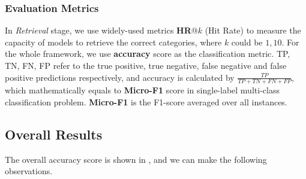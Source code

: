 \subsubsection{Evaluation Metrics}
In \textit{Retrieval} stage, we use widely-used metrics \textbf{HR}@$k$ (Hit Rate) to measure the capacity of models to retrieve the correct categories, where $k$ could be $1,10$. For the whole framework, we use \textbf{accuracy} score as the classification metric. TP, TN, FN, FP refer to the true positive, true negative, false negative and false positive predictions respectively, and accuracy is calculated by $\frac{TP}{TP+TN+FN+FP}$, which mathematically equals to \textbf{Micro-F1} score in single-label multi-class classification problem. \textbf{Micro-F1} is the F1-score averaged over all instances. 

\subsection{Overall Results}
\label{sec:all res}
The overall accuracy score is shown in , and we can make the following observations.


